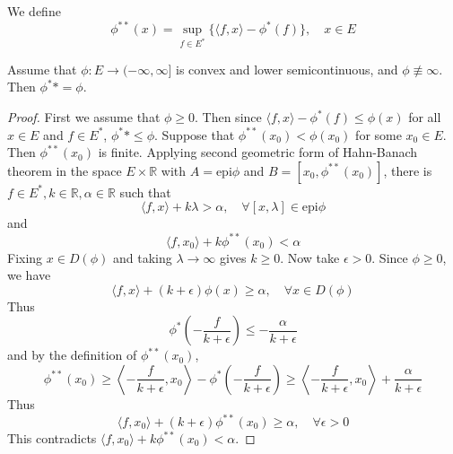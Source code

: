 \begin{defn} We define
\begin{equation}
\phi^{**}(x)=\sup_{f\in E^*} \{\langle f,x\rangle-\phi^*(f)\},\quad x \in E
\end{equation}
\end{defn}

\begin{thm} Assume that $\phi:E\rightarrow (-\infty,\infty]$ is convex and lower semicontinuous, and $\phi\not\equiv \infty$. Then $\phi^**=\phi$.
\end{thm}
\begin{proof}
First we assume that $\phi\geq 0$. Then since $\langle f,x\rangle-\phi^*(f)\leq \phi(x)$ for all $x\in E$ and $f\in E^*$, $\phi^**\leq \phi$. Suppose that $\phi^{**}(x_0)<\phi(x_0)$ for some $x_0\in E$. Then $\phi^{**}(x_0)$ is finite. Applying second geometric form of Hahn-Banach theorem in the space $E\times \mathbb{R}$ with $A=\textrm{epi}\phi$ and $B=[x_0,\phi^{**}(x_0)]$, there is $f\in E^*, k\in \mathbb{R}, \alpha\in \mathbb{R}$ such that
\begin{equation}
\langle f,x\rangle+k\lambda>\alpha,\quad \forall[x,\lambda]\in \textrm{epi}\phi
\end{equation}
and
\begin{equation}
\langle f,x_0\rangle+k\phi^{**}(x_0)<\alpha
\end{equation}
Fixing $x\in D(\phi)$ and taking $\lambda\rightarrow \infty$ gives $k\geq 0$. Now take $\epsilon>0$. Since $\phi\geq 0$, we have
\begin{equation}
\langle f,x\rangle+(k+\epsilon)\phi(x)\geq \alpha,\quad \forall x\in D(\phi)
\end{equation}
Thus
\begin{equation}
\phi^*\left(-\frac{f}{k+\epsilon}\right)\leq -\frac{\alpha}{k+\epsilon}
\end{equation}
and by the definition of $\phi^{**}(x_0)$,
\begin{equation}
\phi^{**}(x_0)\geq \left\langle -\frac{f}{k+\epsilon},x_0\right\rangle-\phi^*\left(-\frac{f}{k+\epsilon}\right)\geq \left\langle -\frac{f}{k+\epsilon},x_0\right\rangle+\frac{\alpha}{k+\epsilon}
\end{equation}
Thus
\begin{equation}
\langle f,x_0\rangle+(k+\epsilon)\phi^{**}(x_0)\geq \alpha,\quad \forall \epsilon>0
\end{equation}
This contradicts $\langle f,x_0\rangle+k\phi^{**}(x_0)<\alpha$.


\end{proof}
